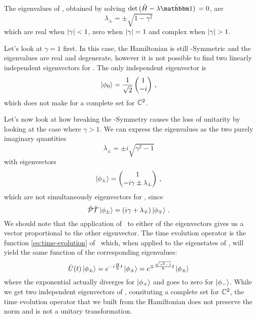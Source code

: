         The eigenvalues of \hH, obtained by solving $\det\pqty*{\hH - \lambda\hidM} = 0$, are
        \begin{equation*}
            \lambda_\pm = \pm\sqrt{1-\gamma^2}
        \end{equation*}
        which are real when $\abs{\gamma} < 1$, zero when $\abs{\gamma} = 1$ and complex when $\abs{\gamma} > 1$.
        
        Let's look at $\gamma = 1$ first. In this case, the Hamiltonian is still \PT-Symmetric and the eigenvalues are real and degenerate, however it is not possible to find two linearly independent eigenvectors for \hH. The only independent eigenvector is
        \begin{equation*}
            \ket{\phi_0} = \frac{1}{\sqrt{2}}\pmqty{1 \\ -i}
            \mycomma
        \end{equation*}
        which does not make for a complete set for $\mathbb{C}^2$.

        Let's now look at how breaking the \PT-Symmetry causes the loss of unitarity by looking at the case where $\gamma > 1$. We can express the eigenvalues as the two purely imaginary quantities
        \begin{equation*}
            \lambda_\pm = \pm i \sqrt{\gamma^2 - 1}
        \end{equation*}
        with eigenvectors
        \begin{equation*}
            \ket{\phi_\pm} = \pmqty{1 \\ -i\gamma \pm \lambda_\pm}
            \mycomma
        \end{equation*}
        which are not simultaneously eigenvectors for \hPT, since
        \begin{equation*}
            \hPT\ket{\phi_\pm} = \pqty{i\gamma + \lambda_\mp}\ket{\phi_\mp}
            \myperiod
        \end{equation*}
        We should note that the application of \hPT\ to either of the eigenvectors gives us a vector proportional to the other eigenvector. The time evolution operator is the function \eqref{eq:time-evolution} of \hH\ which, when applied to the eigenstates of \hH, will yield the same function of the corresponding eigenvalues:
        \begin{equation*}
            \hU\pqty{t}\ket{\phi_\pm} = \myexp{-i\frac{\hH}{\hbar}t}\ket{\phi_\pm} = \myexp{\mp\frac{\sqrt{\gamma^2-1}}{\hbar}t}\ket{\phi_\pm}
        \end{equation*}
        where the exponential actually diverges for $\ket{\phi_+}$ and goes to zero for $\ket{\phi_-}$. While we get two independent eigenvectors of \hH, consituting a complete set for $\mathbb{C}^2$, the time evolution operator that we built from the Hamiltonian does not preserve the norm and is not a unitary transformation.


